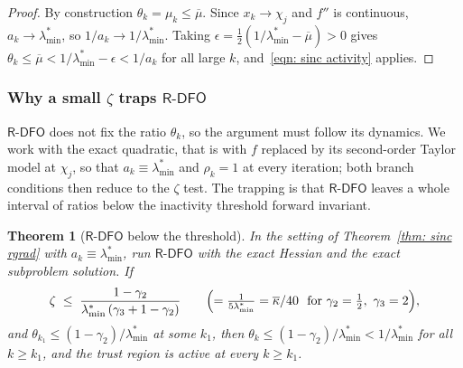 \documentclass[11pt]{article}
\theoremstyle{plain}
\newtheorem{theorem}{Theorem}[section]
\theoremstyle{definition}
\theoremstyle{remark}
\numberwithin{equation}{section}
\newcommand{\Rdfo}{\textsf{R-DFO}}
\providecommand{\gtwo}{\gamma_2}
\providecommand{\gthree}{\gamma_3}
\providecommand{\kbar}{\overline{\kappa}}
\providecommand{\kbar}{\overline{\kappa}}
\begin{document}
\begin{proof}
    By construction $\theta_k = \mu_k \leq \overline{\mu}$. Since $x_k \to \chi_j$ and $f''$ is
    continuous, $a_k \to \lambda^*_{\min}$, so $1/a_k \to 1/\lambda^*_{\min}$. Taking
    $\epsilon = \tfrac12(1/\lambda^*_{\min} - \overline{\mu}) > 0$ gives
    $\theta_k \leq \overline{\mu} < 1/\lambda^*_{\min} -
    \epsilon < 1/a_k$ for all large $k$, and~\eqref{eqn: sinc activity} applies.
\end{proof}

\subsubsection{Why a small \texorpdfstring{$\zeta$}{zeta} traps
              \texorpdfstring{$\Rdfo$}{R-DFO}}

$\Rdfo$ does not fix the ratio $\theta_k$, so the argument must follow its dynamics. We work with
the exact quadratic, that is with $f$ replaced by its second-order Taylor model at $\chi_j$, so
that $a_k \equiv \lambda^*_{\min}$ and $\rho_k = 1$ at every iteration; both branch conditions then reduce to the
$\zeta$ test. The trapping is that $\Rdfo$ leaves a whole interval of ratios below the inactivity
threshold forward invariant.

\begin{theorem}[$\Rdfo$ below the threshold]
\label{thm: sinc rdfo}
    In the setting of Theorem~\ref{thm: sinc rgrad} with $a_k \equiv \lambda^*_{\min}$, run $\Rdfo$ with the
    exact Hessian and the exact subproblem solution. If
    \begin{equation}
        \zeta \;\leq\; \frac{1 - \gtwo}{\lambda^*_{\min}\,(\gthree + 1 - \gtwo)}
        \qquad\Bigl(= \tfrac{1}{5\lambda^*_{\min}} = \kbar/40 \ \text{ for } \gtwo = \tfrac12,\ \gthree = 2\Bigr),
        \label{eqn: sinc zeta threshold}
    \end{equation}
    and $\theta_{k_1} \leq (1-\gtwo)/\lambda^*_{\min}$ at some $k_1$, then $\theta_k \leq (1-\gtwo)/\lambda^*_{\min} < 1/\lambda^*_{\min}$ for
    all $k \geq k_1$, and the trust region is active at every $k \geq k_1$.
\end{theorem}
\end{document}

